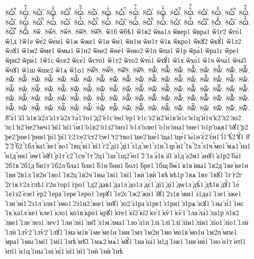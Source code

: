 {8ѽꙴ҇.
8ꙍ҆̑ꙴ҇.
8ѽꙵ.
8ꙍ҆̑ꙵ.
8ѽꙵ҇.
8ꙍ҆̑ꙵ҇.
8ѽꙶ.
8ꙍ҆̑ꙶ.
8ѽꙶ҇.
8ꙍ҆̑ꙶ҇.
8ѽꙷ.
8ꙍ҆̑ꙷ.
8ѽꙷ҇.
8ꙍ҆̑ꙷ҇.
8ѽꙸ.
8ꙍ҆̑ꙸ.
8ѽꙸ҇.
8ꙍ҆̑ꙸ҇.
8ѽꙹ.
8ꙍ҆̑ꙹ.
8ѽꙹ҇.
8ꙍ҆̑ꙹ҇.
8ѽꙺ.
8ꙍ҆̑ꙺ.
8ѽꙺ҇.
8ꙍ҆̑ꙺ҇.
8ѽꙻ.
8ꙍ҆̑ꙻ.
8ѽꙻ҇.
8ꙍ҆̑ꙻ҇.
8ѽ꙼.
8ꙍ҆̑꙼.
8ѽ꙼҇.
8ꙍ҆̑꙼҇.
8ѽ꙽.
8ꙍ҆̑꙽.
8ѽ꙽҇.
8ꙍ҆̑꙽҇.
8ѿ.
8ѿ̀8.
8ѿ́8.
8ѿ̈8.
8ѿ̑8.
ѿ1б
ѿбѣ1
ѿ1в2
ѿва1л
ѿвер1
ѿвра1
ѿ1г2
ѿго́1
ѿ1д
1ѿ1е
ѿе́2
ѿе́м1
ѿ1ж
ѿже1
ѿ1и
ѿи́1
ѿи1м
ѿи1т
ѿ1к
ѿкро1
ѿкꙋ2
ѿкꙋ́1
ѿ1л2
ѿлꙋ1
ѿ1м2
ѿме1
ѿмы1
ѿ1н2
ѿне2
ѿне́1
ѿню2
ѿ1п
ѿпа1
ѿ1р
ѿра́1
ѿра1с
ѿре1
ѿри2
ѿри́1
1ѿ1с
ѿсе2
ѿсе́1
ѿсто1
ѿ1т2
ѿто2
ѿто́1
ѿтꙋ́1
ѿ1х
ѿхо́1
ѿ1ч
ѿча́1
ѿча̑1
ѿчꙋ1
ѿ1ш
ѿше2
ѿ1ѧ
ѿ1ѻ1
8ѿ҆̀8.
8ѿ҆́8.
8ѿ҆̈8.
8ѿ҆̑8.
8ѿⷠ.
8ѿⷠ҇.
8ѿⷡ.
8ѿⷡ҇.
8ѿⷢ.
8ѿⷢ҇.
8ѿⷣ.
8ѿⷣ҇.
8ѿⷤ.
8ѿⷤ҇.
8ѿⷥ.
8ѿⷥ҇.
8ѿⷦ.
8ѿⷦ҇.
8ѿⷧ.
8ѿⷧ҇.
8ѿⷨ.
8ѿⷨ҇.
8ѿⷩ.
8ѿⷩ҇.
8ѿⷪ.
8ѿⷪ҇.
8ѿⷫ.
8ѿⷫ҇.
8ѿⷬ.
8ѿⷬ҇.
8ѿⷭ.
8ѿⷭ҇.
8ѿⷮ.
8ѿⷮ҇.
8ѿⷯ.
8ѿⷯ҇.
8ѿⷰ.
8ѿⷰ҇.
8ѿⷱ.
8ѿⷱ҇.
8ѿⷲ.
8ѿⷲ҇.
8ѿⷳ.
8ѿⷳ҇.
8ѿⷴ.
8ѿⷴ҇.
8ѿⷵ.
8ѿⷵ҇.
8ѿⷶ.
8ѿⷶ҇.
8ѿⷷ.
8ѿⷷ҇.
8ѿⷸ.
8ѿⷸ҇.
8ѿⷹ.
8ѿⷹ҇.
8ѿⷺ.
8ѿⷺ҇.
8ѿⷻ.
8ѿⷻ҇.
8ѿⷼ.
8ѿⷼ҇.
8ѿⷽ.
8ѿⷽ҇.
8ѿⷾ.
8ѿⷾ҇.
8ѿⷿ.
8ѿⷿ҇.
8ѿꙴ.
8ѿꙴ҇.
8ѿꙵ.
8ѿꙵ҇.
8ѿꙶ.
8ѿꙶ҇.
8ѿꙷ.
8ѿꙷ҇.
8ѿꙸ.
8ѿꙸ҇.
8ѿꙹ.
8ѿꙹ҇.
8ѿꙺ.
8ѿꙺ҇.
8ѿꙻ.
8ѿꙻ҇.
8ѿ꙼.
8ѿ꙼҇.
8ѿ꙽.
8ѿ꙽҇.
8҃
҃а́1
҃а̑1
҃а1в
҃а2л
҃а1т
҃а2х
҃га́1
҃го1
҃д2
҃е́1с
҃ен1
҃ер1
҃е1с
҃з2
҃и2
҃и́1в
҃и́1с
҃и́1ц
҃и́1ч
҃к2
҃л2
҃ло2
҃лє1
҃н2
҃не2
҃неч1
҃нї1
҃нї1
҃о́в1
҃о1в2
҃о1з2
҃оиз1
҃о1л
҃олю1
҃о1н
҃она1
҃оне1
҃о1р
҃оѧв1
҃оꙋ1
҃р2
҃ре2
҃рне1
҃рни1
҃рї1
҃рї1
҃с2
҃се2
҃ст2
҃сѡ1
҃т2
҃тво1
҃ше2
҃ше́1
҃ща́1
҃ще́1
҃ы́1н
҃є́2
҃є́н1
҃і́1
҃ѣ́2
҃ꙋ́1
8҆
҆2̀
҆2́
҆́б2
҆́1бл
҆́ва1
҆́ве1
҆́во1
҆́1вц
҆́вї1
҆́вї1
҆́г2
҆́дї1
҆́дї1
҆́з1д
҆́зе1
҆́з1н
҆́1зр
҆́и1
҆́1к
҆́2л
҆́л1ч
҆́мо1
҆́мѧ1
҆́на1
҆́н1д
҆́ни1
҆́нѡ1
҆́нꙋ1
҆́р1т
҆́с2
҆́1сн
҆́1т
҆́2ц1
҆́1ш
҆́1щ2
҆́ю1
҆2̑
҆1а
҆а́1к
҆а̑1
҆а1д
҆а2м1
҆анꙋ1
҆а1р2
҆ба́1
҆2б1в
҆2б1д
҆би1т
҆1б2л
҆бла1
҆бли1
҆б1н
҆бни1
҆бол1
҆бре1
҆1бщ
҆бѡ́1
҆в1в
҆вва1
҆1в2д
҆1ве
҆ве1н
҆1ви
҆2в1л
҆1в2н
҆1во1
҆1в2ц
҆1в2ч
҆1вы
҆1вї1
҆1вї1
҆1вѝ
҆1вѝ
҆1вѣ
҆вѣ1р
҆1вѧ
҆1вѵ
҆1вꙋ1
҆1г
҆г2г
҆2г1к
҆г2л
҆глѣ1
҆г2н
҆гор1
҆гро1
҆1д2
҆дав1
҆да1л
҆до1л
҆дє́1
҆дї1
҆дї1
҆дѡ1л
҆дѣ́1
҆дѣ1в
҆дꙋ́1
҆1е́
҆1е1з2
҆езе1
҆ер2
҆1ера
҆1ере
҆1еро1
҆1ерꙋ1
҆1е2с
҆1ж2
҆жи́1
҆з̾ꙋ1
҆2з1в
҆зви1
҆з1да1
҆1зе1
҆зже1
҆1зи
҆зи́1
҆2з1л
҆зли1
҆змо1
҆2з1н2
҆зне1
҆знꙋ1
҆зо2
҆з1ра
҆з1ре1
҆з1ри1
҆з1рѧ
҆зсꙋ1
҆1зы
҆зі́1
҆1ис
҆1к
҆ка1л
҆ке1
҆кле1
҆кло1
҆ко1в
҆кро1
҆крꙋ1
҆кте1
҆кї2
҆кї2
҆кѵ́1
҆кѷ1
҆кѷ1
҆1ла
҆ла́1
҆ла1р
҆л1в2
҆лве1
҆1ле
҆лез1
҆леѵ1
҆1ли
҆ли́1
҆ли̑1
҆л1м
҆лма1
҆1ло
҆л1п
҆1лі
҆1лї
҆1лї
҆лїи1
҆лїи1
҆лїо1
҆лїо1
҆1лѝ
҆1лѝ
҆1лѷ2
҆1лѷ2
҆1лꙋ1
҆1ма
҆м1в
҆1ме
҆ме1н
҆1ми
҆1мл
҆1м2н
҆1мо
҆мо1в
҆мо1н
҆1м2п
҆мпе1
҆мра1
҆1мы
҆1мї1
҆1мї1
҆1мѣ
҆мѣ̑1
҆1мѧ2
҆мѧ́1
҆мꙋ́1
҆1на
҆на́1
҆н1д
҆1не1
҆1ни
҆ни́1
҆1но
҆н1т
҆нтї1
҆нтї1
҆н1ц
҆1ны
҆1ні
҆ні́1
҆нї1
҆нї1
҆1нѝ
҆1нѝ
҆1нѣ
}
